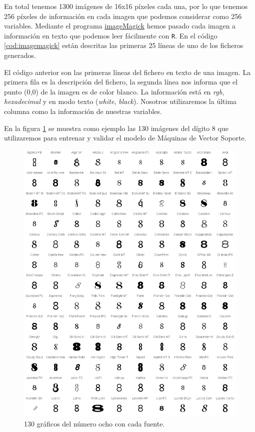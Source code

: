 \documentclass[12pt,spanish,a4paper]{article}
\numberwithin{equation}{section}
\begin{document}
En total tenemos 1300 imágenes de 16x16 píxeles cada una, por lo que
tenemos 256 píxeles de información en cada imagen que podemos considerar
como 256 variables. Mediante el programa
\href{http://www.imagemagick.org/}{imageMagick} hemos pasado cada imagen
a información en texto que podemos leer fácilmente con \texttt{R}. En el
código \ref{cod:imagemagick} están descritas las primeras 25 líneas de
uno de los ficheros generados.



El código anterior son las primeras líneas del fichero en texto de una
imagen. La primera fila es la descripción del fichero, la segunda línea
nos informa que el punto (0,0) de la imagen es de color blanco. La
información está en \emph{rgb}, \emph{hexadecimal} y en modo texto
(\emph{white}, \emph{black}). Nosotros utilizaremos la última columna
como la información de nuestras variables.

En la figura \ref{fig:imagenes_8} se muestra como ejemplo las 130
imágenes del dígito 8 que utilizaremos para entrenar y validar el modelo
de Máquinas de Vector Soporte.

\begin{figure}[h]

{\centering \includegraphics[width=0.8\linewidth]{graphics/svm/imagenes_8-1} 

}

\caption{130 gráficos del número ocho con cada fuente.}\label{fig:imagenes_8}
\end{figure}
\end{document}
